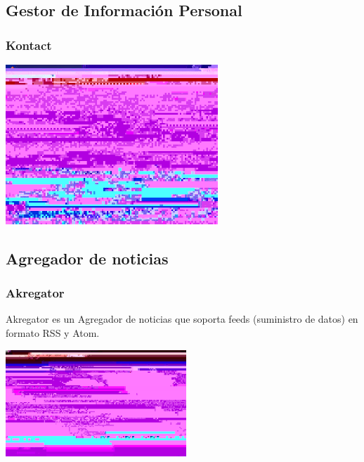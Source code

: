 \subsection{Gestor de Información Personal}
\frame
{
	\frametitle{Kontact}
	\begin{center}
		\includegraphics[height=6cm]{./imgs/kontact2}
	\end{center}
}
\subsection{Agregador de noticias}
\frame
{
	\frametitle{Akregator}
	Akregator es un Agregador de noticias que soporta feeds (suministro de datos) en formato RSS y Atom.
	\begin{center}
		\includegraphics[height=4cm]{./imgs/akregator}
	\end{center}
}

